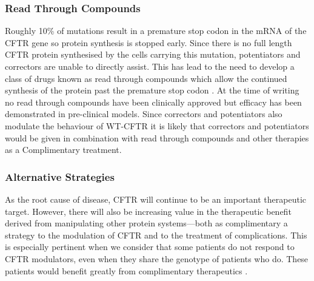 \subsubsection{Read Through Compounds}
Roughly 10\% of mutations result in a premature stop codon in the mRNA of the CFTR gene so protein synthesis is stopped early. Since there is no full length CFTR protein synthesised by the cells carrying this mutation, potentiators and correctors are unable to directly assist. This has lead to the need to develop a class of drugs known as read through compounds which allow the continued synthesis of the protein past the premature stop codon \cite{sharma2021}. At the time of writing no read through compounds have been clinically approved but efficacy has been demonstrated in pre-clinical models\cite{crawford2021}. Since correctors and potentiators also modulate the behaviour of WT-CFTR it is likely that correctors and potentiators would be given in combination with read through compounds and other therapies as a Complimentary treatment.

\subsubsection{Alternative Strategies}
As the root cause of disease, CFTR will continue to be an important therapeutic target. However, there will also be increasing value in the therapeutic benefit derived from manipulating other protein systems---both as complimentary a strategy to the modulation of CFTR and to the treatment of complications. This is especially pertinent when we consider that some patients do not respond to CFTR modulators, even when they share the genotype of patients who do. These patients would benefit greatly from complimentary therapeutics \cite{hanafin2021, robertson2015, lingam2017, seelig2020, barbieri2021a, grebert2019}. 


